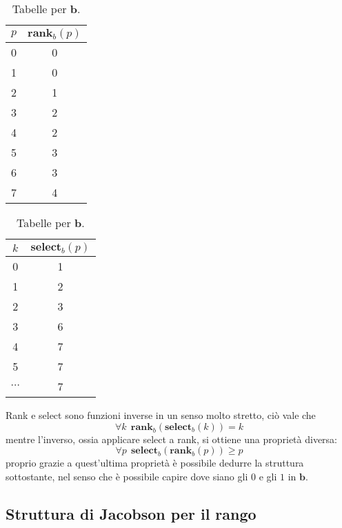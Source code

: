 \begin{table}[ht]
	\centering

	\begin{subtable}{0.45\textwidth}
		\centering
		\begin{tabular}{c|c}
			$p$ & $\mathbf{rank}_b(p)$ \\ \hline
			0   & 0                    \\
			1   & 0                    \\
			2   & 1                    \\
			3   & 2                    \\
			4   & 2                    \\
			5   & 3                    \\
			6   & 3                    \\
			7   & 4
		\end{tabular}
		\caption{$\mathbf{rank}_b(p)$}
	\end{subtable}
	\begin{subtable}{0.45\textwidth}
		\centering
		\begin{tabular}{c|c}
			$k$      & $\mathbf{select}_b(p)$ \\ \hline
			0        & 1                      \\
			1        & 2                      \\
			2        & 3                      \\
			3        & 6                      \\
			4        & 7                      \\
			5        & 7                      \\
			$\cdots$ & 7                      \\
		\end{tabular}
		\caption{$\mathbf{select}_b(p)$}
	\end{subtable}
	\caption{Tabelle per $\mathbf{b}$.}
	\label{table:rank_sel}
\end{table}
Rank e select sono funzioni inverse in un senso molto stretto, ciò vale che
$$
	\forall k ~~ \mathbf{rank}_b(\mathbf{select}_b(k)) = k
$$
mentre l'inverso, ossia applicare select a rank, si ottiene una proprietà
diversa:
$$
	\forall p ~~ \mathbf{select}_b(\mathbf{rank}_b(p)) \geq p
$$
proprio grazie a quest'ultima proprietà è possibile dedurre la struttura sottostante,
nel senso che è possibile capire dove siano gli $0$ e gli $1$ in $\mathbf{b}$.

\subsection{Struttura di Jacobson per il rango}
